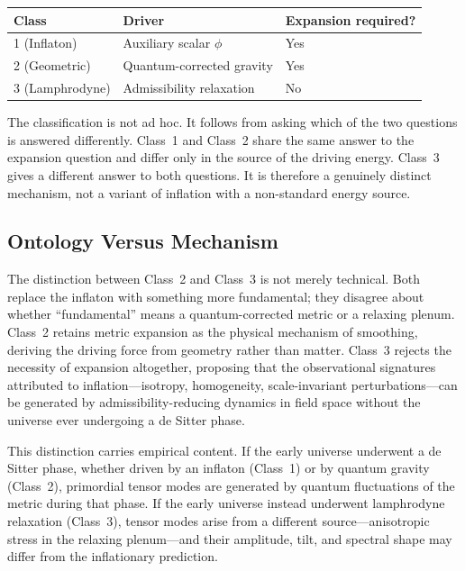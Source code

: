 \documentclass[12pt, a4paper]{article}
\begin{document}
\begin{center}
\begin{tabular}{lll}
\toprule
\textbf{Class} & \textbf{Driver} & \textbf{Expansion required?} \\
\midrule
1 (Inflaton) & Auxiliary scalar $\phi$ & Yes \\
2 (Geometric) & Quantum-corrected gravity & Yes \\
3 (Lamphrodyne) & Admissibility relaxation & No \\
\bottomrule
\end{tabular}
\end{center}

The classification is not ad hoc. It follows from asking which of the two questions
is answered differently. Class~1 and Class~2 share the same answer to the expansion
question and differ only in the source of the driving energy. Class~3 gives a
different answer to both questions. It is therefore a genuinely distinct mechanism,
not a variant of inflation with a non-standard energy source.

\subsection{Ontology Versus Mechanism}

The distinction between Class~2 and Class~3 is not merely technical. Both replace
the inflaton with something more fundamental; they disagree about whether
``fundamental'' means a quantum-corrected metric or a relaxing plenum. Class~2
retains metric expansion as the physical mechanism of smoothing, deriving the
driving force from geometry rather than matter. Class~3 rejects the necessity of
expansion altogether, proposing that the observational signatures attributed to
inflation---isotropy, homogeneity, scale-invariant perturbations---can be generated
by admissibility-reducing dynamics in field space without the universe ever
undergoing a de Sitter phase.

This distinction carries empirical content. If the early universe underwent a
de Sitter phase, whether driven by an inflaton (Class~1) or by quantum gravity
(Class~2), primordial tensor modes are generated by quantum fluctuations of the
metric during that phase. If the early universe instead underwent lamphrodyne
relaxation (Class~3), tensor modes arise from a different source---anisotropic
stress in the relaxing plenum---and their amplitude, tilt, and spectral shape may
differ from the inflationary prediction.
\end{document}
